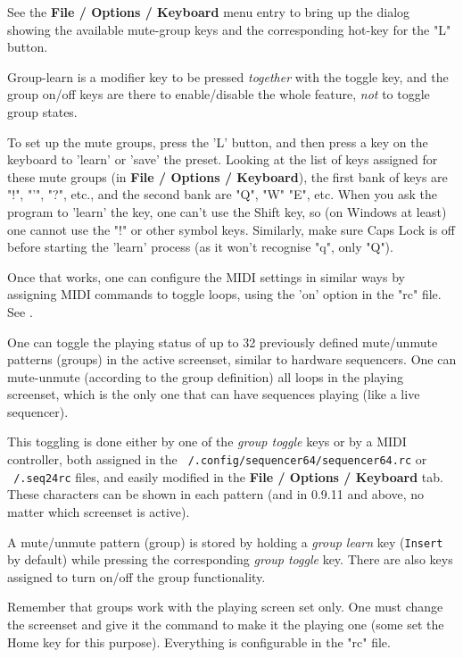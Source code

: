    See the \textbf{File / Options / Keyboard} menu entry to bring up the
   dialog showing the available mute-group keys and the corresponding
   hot-key for the "L" button.

   Group-learn is a modifier key to be pressed \textsl{together}
   with the toggle key, and the group on/off keys are there to enable/disable
   the whole feature, \textsl{not} to toggle group states.

   To set up the mute groups, press the 'L' button, and then press a key on
   the keyboard to 'learn' or 'save' the preset. Looking at the list of keys
   assigned for these mute groups (in \textbf{File / Options / Keyboard}),
   the first bank of keys are "!", "'", "?", etc., and the second bank are
   "Q", "W" "E", etc.  When you ask the program to 'learn' the key, one can't
   use the Shift key, so (on Windows at least) one cannot use the "!" or
   other symbol keys.  Similarly, make sure Caps Lock is off before starting
   the 'learn' process (as it won't recognise "q", only "Q").

   Once that works, one can configure the MIDI settings in similar ways
   by assigning MIDI commands to toggle loops, using 
   the 'on' option in the "rc" file.
   See .

	One can toggle the playing status of up to 32 previously
	defined mute/unmute patterns (groups) in the active screenset,
   similar to hardware sequencers.
   One can mute-unmute (according to the group definition) all loops in the
   playing screenset, which is the only one that can have sequences playing
   (like a live sequencer).

	This toggling is done either by one of the \textsl{group toggle} keys
	or by a MIDI controller, both assigned in the
   \texttt{~/.config/sequencer64/sequencer64.rc} or \texttt{~/.seq24rc} files,
   and easily modified in the \textbf{File / Options / Keyboard} tab.
   These characters can be shown in each pattern (and in 0.9.11 and above, no
   matter which screenset is active).

	A mute/unmute pattern (group) is stored by holding a
   \textsl{group learn} key (\texttt{Insert} by default) while pressing the
   corresponding \textsl{group toggle} key.
	There are also keys assigned to turn on/off the group functionality.

   Remember that groups work with the playing screen set only.
   One must change the screenset and give it the command to make it the
   playing one
   (some set the Home key for this purpose).
   Everything is configurable in the "rc" file.

